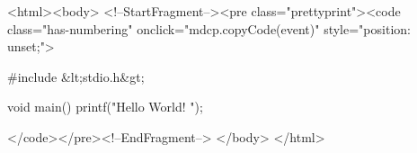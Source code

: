 <html><body>
<!--StartFragment--><pre class="prettyprint"><code class="has-numbering" onclick="mdcp.copyCode(event)" style="position: unset;">\begin{verbbox}
#include &lt;stdio.h&gt;

void main()
{
    printf("Hello World! \n");
}
\end{verbbox}  

\begin{figure}[ht]
  \centering            %
  \theverbbox 
\end{figure}</code></pre><!--EndFragment-->
</body>
</html>

